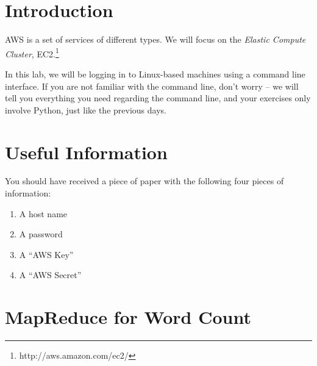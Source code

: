 \section{Introduction}

AWS is a set of services of different types. We will focus on the \emph{Elastic
Compute Cluster}, EC2.\footnote{http://aws.amazon.com/ec2/}

In this lab, we will be logging in to Linux-based machines using a command line
interface. If you are not familiar with the command line, don't worry -- we
will tell you everything you need regarding the command line, and your
exercises only involve Python, just like the previous days.

\section{Useful Information}

You should have received a piece of paper with the following four pieces of
information:

\begin{enumerate}
\item A host name
\item A password
\item A ``AWS Key''
\item A ``AWS Secret''
\end{enumerate}

%
%
%
%

\section{MapReduce for Word Count}

